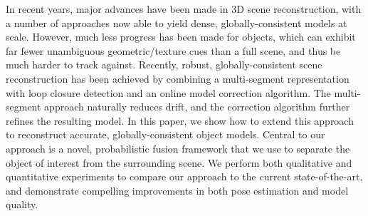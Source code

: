 \noindent In recent years, major advances have been made in 3D scene reconstruction, with a number of approaches now able to yield dense, globally-consistent models at scale. However, much less progress has been made for objects, which can exhibit far fewer unambiguous geometric/texture cues than a full scene, and thus be much harder to track against. Recently, robust, globally-consistent scene reconstruction has been achieved by combining a multi-segment representation with loop closure detection and an online model correction algorithm. The multi-segment approach naturally reduces drift, and the correction algorithm further refines the resulting model. In this paper, we show how to extend this approach to reconstruct accurate, globally-consistent object models. Central to our approach is a novel, probabilistic fusion framework that we use to separate the object of interest from the surrounding scene. We perform both qualitative and quantitative experiments to compare our approach to the current state-of-the-art, and demonstrate compelling improvements in both pose estimation and model quality.